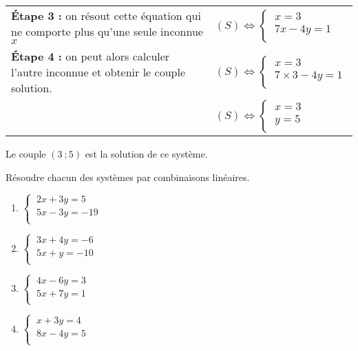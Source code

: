 \documentclass[a4paper,11pt,cours]{nsi}
\begin{document}
\begin{methode}[ ]
\begin{tabular}{p{8cm}p{8cm}}
		\textbf{\'Etape 3 :} on résout cette équation qui ne comporte plus qu'une seule inconnue $x$ & $(S) \Leftrightarrow \left\{
		\begin{array}{l}
			\ x=3 \\
			\ 7x-4y=1 \\
		\end{array} \right.$\\
		
		\textbf{\'Etape 4 :} on	peut alors calculer l'autre inconnue et obtenir le couple solution. & $(S) \Leftrightarrow \left\{
		\begin{array}{l}
			\ x=3 \\
			\ 7\times 3-4y=1 \\
		\end{array} \right.$\\
		& $(S) \Leftrightarrow \left\{
		\begin{array}{l}
			\ x=3 \\
			\ y=5 \\
		\end{array} \right.$\\
	\end{tabular}
	Le couple $(3\ ;5)$ est la solution de ce système.
\end{methode}

\begin{exercice}[ ]
	Résoudre chacun des systèmes par combinaisons linéaires.
	\begin{multicols}{2}
		\begin{enumerate}
			\item 		$\left\{
			\begin{array}{l}
				\ 2x+3y=5 \\
				\ 5x-3y=-19\\
			\end{array} \right.$
			\item 		$\left\{
			\begin{array}{l}
				\ 3x+4y=-6 \\
				\ 5x+y=-10 \\
			\end{array} \right.$	
			\item 		$\left\{
			\begin{array}{l}
				\ 4x-6y=3 \\
				\ 5x+7y=1 \\
			\end{array} \right.$
			\item 		$\left\{
			\begin{array}{l}
				\ x+3y=4 \\
				\ 8x-4y=5 \\
			\end{array} \right.$
		\end{enumerate}
	\end{multicols}
\end{exercice}
\end{document}
